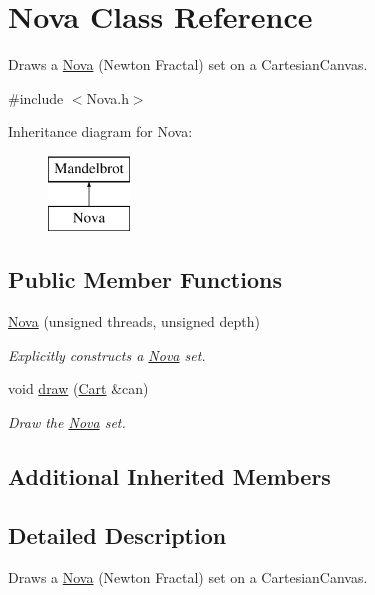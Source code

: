 \hypertarget{class_nova}{}\section{Nova Class Reference}
\label{class_nova}


Draws a \hyperlink{class_nova}{Nova} (Newton Fractal) set on a Cartesian\+Canvas.  




{\ttfamily \#include $<$Nova.\+h$>$}

Inheritance diagram for Nova\+:\begin{figure}[H]
\begin{center}
\leavevmode
\includegraphics[height=2.000000cm]{class_nova}
\end{center}
\end{figure}
\subsection*{Public Member Functions}
\begin{DoxyCompactItemize}
\item 
\hyperlink{class_nova_a9d171954a6dd98b125587be83ef04db5}{Nova} (unsigned threads, unsigned depth)
\begin{DoxyCompactList}\small\item\em Explicitly constructs a \hyperlink{class_nova}{Nova} set. \end{DoxyCompactList}\item 
void \hyperlink{class_nova_a66935ba0814dfabcae2481c128c336ec}{draw} (\hyperlink{classtsgl_1_1_cartesian_canvas}{Cart} \&can)
\begin{DoxyCompactList}\small\item\em Draw the \hyperlink{class_nova}{Nova} set. \end{DoxyCompactList}\end{DoxyCompactItemize}
\subsection*{Additional Inherited Members}


\subsection{Detailed Description}
Draws a \hyperlink{class_nova}{Nova} (Newton Fractal) set on a Cartesian\+Canvas. 

